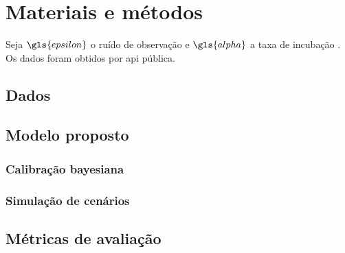 \chapter{Materiais e métodos}
\label{cap:modelo}

\lipsum[1]

Seja $\gls{epsilon}$ o ruído de observação e $\gls{alpha}$ a taxa de incubação \cite{Andreis2022}. Os dados foram obtidos por \gls{api} pública.

\section{Dados}
\lipsum[2-3]

\section{Modelo proposto}
\lipsum[3-4]

\subsection{Calibração bayesiana}
\lipsum[6]

\subsection{Simulação de cenários}
\lipsum[7]

\section{Métricas de avaliação}
\lipsum[4-5]
